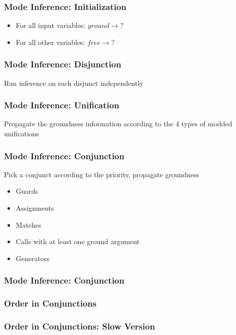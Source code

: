 \documentclass[xcolor=table]{beamer}
\begin{document}
\begin{frame}[fragile]
  \frametitle{Mode Inference: Initialization }

\begin{itemize}
  \item For all input variables: $ground \rightarrow ?$
  \item For all other variables: $free \rightarrow ?$
\end{itemize}


\end{frame}

\begin{frame}[fragile]
  \frametitle{Mode Inference: Disjunction }
Run inference on each disjunct independently



\end{frame}


\begin{frame}[fragile]
  \frametitle{Mode Inference: Unification}
Propagate the groundness information according to the 4 types of modded unifications




\end{frame}

\begin{frame}[fragile]
  \frametitle{Mode Inference: Conjunction}
Pick a conjunct according to the priority, propagate groundness
\begin{itemize}
  \item Guards
  \item Assignments
  \item Matches
  \item Calls with at least one ground argument
  \item Generators
\end{itemize}
\end{frame}

\begin{frame}[fragile]
  \frametitle{Mode Inference: Conjunction}



\end{frame}

\begin{frame}[fragile]
  \frametitle{Order in Conjunctions}
  
\end{frame}

\begin{frame}[fragile]
  \frametitle{Order in Conjunctions: Slow Version}
  
\end{frame}
\end{document}
